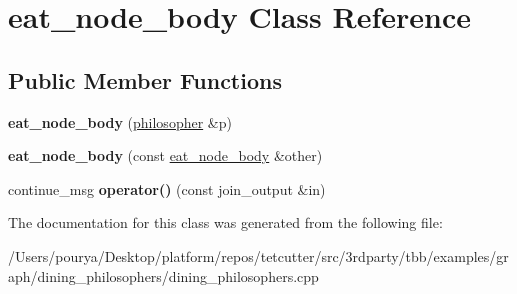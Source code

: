 \hypertarget{classeat__node__body}{}\section{eat\+\_\+node\+\_\+body Class Reference}
\label{classeat__node__body}
\subsection*{Public Member Functions}
\begin{DoxyCompactItemize}
\item 
\hypertarget{classeat__node__body_ac45d578ca84a4e8fb4844e37932d2bdc}{}{\bfseries eat\+\_\+node\+\_\+body} (\hyperlink{classphilosopher}{philosopher} \&p)\label{classeat__node__body_ac45d578ca84a4e8fb4844e37932d2bdc}

\item 
\hypertarget{classeat__node__body_a06716933f4090e5cb63fec504a2cb10c}{}{\bfseries eat\+\_\+node\+\_\+body} (const \hyperlink{classeat__node__body}{eat\+\_\+node\+\_\+body} \&other)\label{classeat__node__body_a06716933f4090e5cb63fec504a2cb10c}

\item 
\hypertarget{classeat__node__body_a55062d6791d60279a2e20032a62f78a6}{}continue\+\_\+msg {\bfseries operator()} (const join\+\_\+output \&in)\label{classeat__node__body_a55062d6791d60279a2e20032a62f78a6}

\end{DoxyCompactItemize}


The documentation for this class was generated from the following file\+:\begin{DoxyCompactItemize}
\item 
/\+Users/pourya/\+Desktop/platform/repos/tetcutter/src/3rdparty/tbb/examples/graph/dining\+\_\+philosophers/dining\+\_\+philosophers.\+cpp\end{DoxyCompactItemize}

